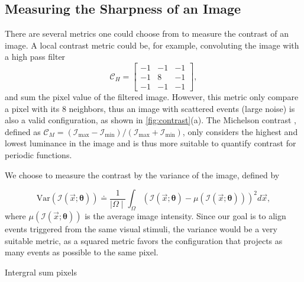 \subsection{Measuring the Sharpness of an Image}
\label{sec:contrast}
There are several metrics one could choose from to measure the
contrast of an image. A local contrast metric could be, for example,
convoluting the image with a high pass filter
\begin{equation}
  \label{eq:high_pass_filter}
  \mathcal{C}_H=
  \begin{bmatrix}
    -1&-1&-1\\
    -1&8&-1\\
    -1&-1&-1
  \end{bmatrix},
\end{equation}
and sum the pixel value of the filtered image. However, this metric
only compare a pixel with its 8 neighbors, thus an image with
scattered events (large noise) is also a valid configuration, as shown
in \cref{fig:contrast}(a). The Michelson contrast
\citep{michelson1995studies}, defined as
$\mathcal{C}_M=\left(\mathcal{I}_{\mathrm{max}}-\mathcal{I}_{\mathrm{min}}\right)/\left(\mathcal{I}_{\mathrm{max}}+\mathcal{I}_{\mathrm{min}}\right)$,
only considers the highest and lowest luminance in the image and is
thus more suitable to quantify contrast for periodic functions.

We choose to measure the contrast by the variance of the image,
defined by

\begin{equation}
  \label{eq:variance}
  \mathrm{Var}\left(\mathcal{I}\left(\vec{x};\bm{\theta}\right)\right)\doteq\frac{1}{\mid\Omega\mid}\int_{\Omega}\left(\mathcal{I}\left(\vec{x};\bm{\theta}\right)-\mu\left(\mathcal{I}\left(\vec{x};\bm{\theta}\right)\right)\right)^2d\vec{x},
\end{equation}
where $\mu\left(\mathcal{I}\left(\vec{x};\bm{\theta}\right)\right)$ is the average
image intensity. Since our goal is to align events triggered from the
same visual stimuli, the variance would be a very suitable metric, as
a squared metric favors the configuration that projects as many events
as possible to the same pixel.

Intergral sum pixels

